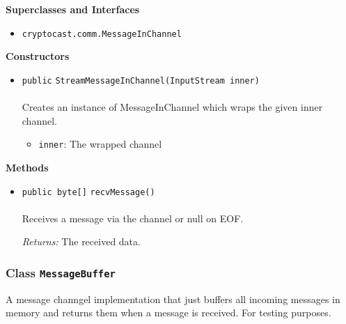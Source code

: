 \textbf{\sffamily Superclasses and Interfaces}
\begin{itemize}
\item \lstinline|cryptocast.comm.MessageInChannel|
\end{itemize}


\textbf{\sffamily Constructors}
\begin{itemize}
\item \lstinline|public| \lstinline|StreamMessageInChannel|\lstinline|(InputStream inner)|\\ \\[-0.6em]
Creates an instance of MessageInChannel which wraps the given inner
 channel.
\begin{itemize}
\item \lstinline|inner|: The wrapped channel
\end{itemize}



\end{itemize}


\textbf{\sffamily Methods}
\begin{itemize}
\item \lstinline|public byte[]| \lstinline|recvMessage|\lstinline|()|\\ \\[-0.6em]
Receives a message via the channel or null on EOF.

\emph{Returns:} The received data.

\end{itemize}

\subsubsection{Class \lstinline|MessageBuffer|}
A message channgel implementation that just buffers all incoming messages
 in memory and returns them when a message is received. For testing purposes. \\
\noindent\begin{minipage}[t]{5cm}
\vspace{0.3em}
\hspace*{2em}
\vspace{0.3em}
\end{minipage}



